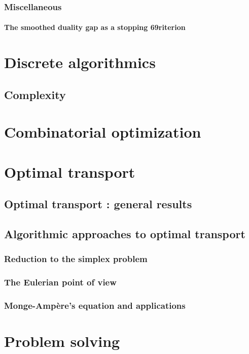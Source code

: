 \documentclass[12pt]{book}
\begin{document}
\section{Miscellaneous}

\subsection{The smoothed duality gap as a stopping 69riterion}

\part{Discrete algorithmics}

\chapter{Complexity}

\part{Combinatorial optimization}

\part{Optimal transport}

\chapter{Optimal transport : general  results}

\chapter{Algorithmic approaches to optimal transport}

\section{Reduction to the simplex problem}
\section{The Eulerian point of view}
\section{Monge-Ampère's equation and applications}

\part{Problem solving}
\end{document}
